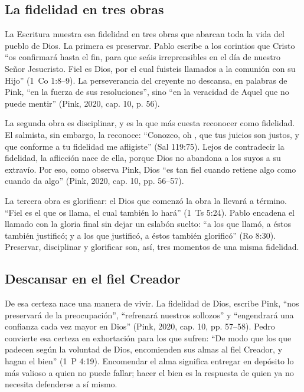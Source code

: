 \subsection{La fidelidad en tres obras}
La Escritura muestra esa fidelidad en tres obras que abarcan toda la vida del pueblo de Dios. La primera es preservar. Pablo escribe a los corintios que Cristo ``os confirmará hasta el fin, para que seáis irreprensibles en el día de nuestro Señor Jesucristo. Fiel es Dios, por el cual fuisteis llamados a la comunión con su Hijo'' (1~Co 1:8--9). La perseverancia del creyente no descansa, en palabras de Pink, ``en la fuerza de sus resoluciones'', sino ``en la veracidad de Aquel que no puede mentir'' (Pink, 2020, cap. 10, p. 56).

La segunda obra es disciplinar, y es la que más cuesta reconocer como fidelidad. El salmista, sin embargo, la reconoce: ``Conozco, oh \SENOR, que tus juicios son justos, y que conforme a tu fidelidad me afligiste'' (Sal 119:75). Lejos de contradecir la fidelidad, la aflicción nace de ella, porque Dios no abandona a los suyos a su extravío. Por eso, como observa Pink, Dios ``es tan fiel cuando retiene algo como cuando da algo'' (Pink, 2020, cap. 10, pp. 56--57).

La tercera obra es glorificar: el Dios que comenzó la obra la llevará a término. ``Fiel es el que os llama, el cual también lo hará'' (1~Ts 5:24). Pablo encadena el llamado con la gloria final sin dejar un eslabón suelto: ``a los que llamó, a éstos también justificó; y a los que justificó, a éstos también glorificó'' (Ro 8:30). Preservar, disciplinar y glorificar son, así, tres momentos de una misma fidelidad.

\subsection{Descansar en el fiel Creador}
De esa certeza nace una manera de vivir. La fidelidad de Dios, escribe Pink, ``nos preservará de la preocupación'', ``refrenará nuestros sollozos'' y ``engendrará una confianza cada vez mayor en Dios'' (Pink, 2020, cap. 10, pp. 57--58). Pedro convierte esa certeza en exhortación para los que sufren: ``De modo que los que padecen según la voluntad de Dios, encomienden sus almas al fiel Creador, y hagan el bien'' (1~P 4:19). Encomendar el alma significa entregar en depósito lo más valioso a quien no puede fallar; hacer el bien es la respuesta de quien ya no necesita defenderse a sí mismo.


